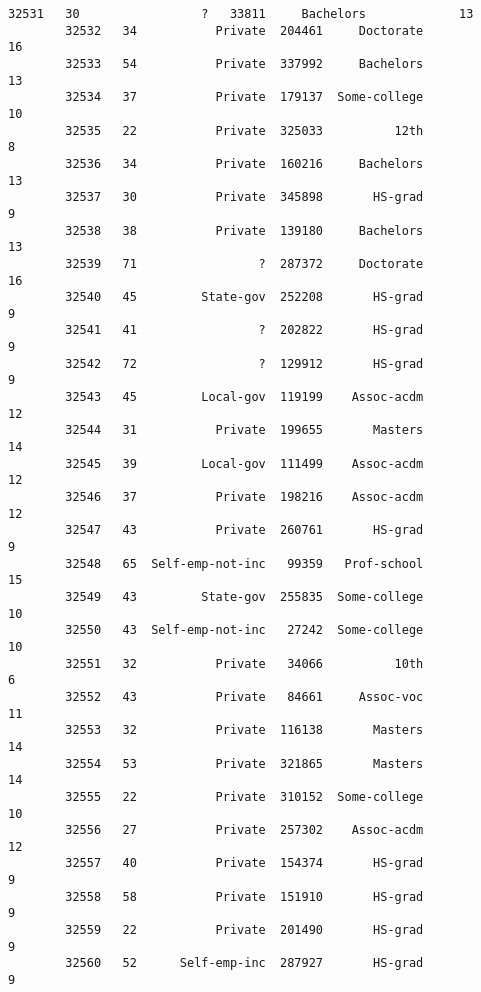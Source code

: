 \documentclass[11pt]{article}
\begin{document}
\begin{Verbatim}[commandchars=\\\{\}]
        32531   30                 ?   33811     Bachelors             13   
        32532   34           Private  204461     Doctorate             16   
        32533   54           Private  337992     Bachelors             13   
        32534   37           Private  179137  Some-college             10   
        32535   22           Private  325033          12th              8   
        32536   34           Private  160216     Bachelors             13   
        32537   30           Private  345898       HS-grad              9   
        32538   38           Private  139180     Bachelors             13   
        32539   71                 ?  287372     Doctorate             16   
        32540   45         State-gov  252208       HS-grad              9   
        32541   41                 ?  202822       HS-grad              9   
        32542   72                 ?  129912       HS-grad              9   
        32543   45         Local-gov  119199    Assoc-acdm             12   
        32544   31           Private  199655       Masters             14   
        32545   39         Local-gov  111499    Assoc-acdm             12   
        32546   37           Private  198216    Assoc-acdm             12   
        32547   43           Private  260761       HS-grad              9   
        32548   65  Self-emp-not-inc   99359   Prof-school             15   
        32549   43         State-gov  255835  Some-college             10   
        32550   43  Self-emp-not-inc   27242  Some-college             10   
        32551   32           Private   34066          10th              6   
        32552   43           Private   84661     Assoc-voc             11   
        32553   32           Private  116138       Masters             14   
        32554   53           Private  321865       Masters             14   
        32555   22           Private  310152  Some-college             10   
        32556   27           Private  257302    Assoc-acdm             12   
        32557   40           Private  154374       HS-grad              9   
        32558   58           Private  151910       HS-grad              9   
        32559   22           Private  201490       HS-grad              9   
        32560   52      Self-emp-inc  287927       HS-grad              9   
        

\end{Verbatim}
\end{document}
